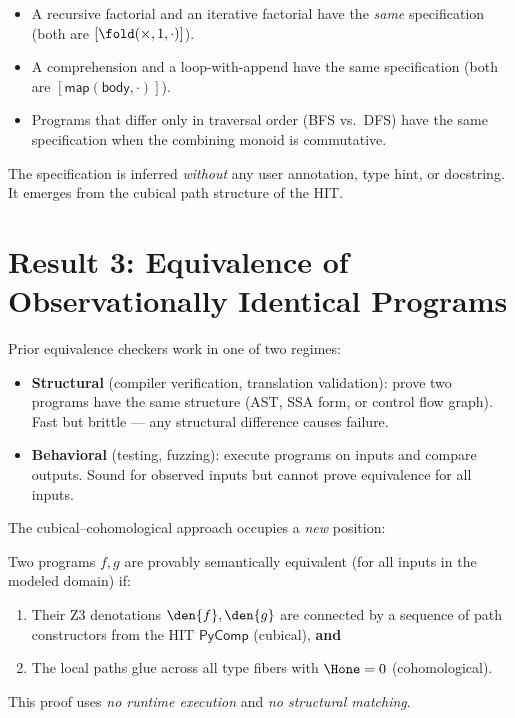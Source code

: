 \begin{itemize}
  \item A recursive factorial and an iterative factorial have the
    \emph{same} specification (both are $[\fold(\times, 1, \cdot)]$).
  \item A comprehension and a loop-with-append have the same
    specification (both are $[\mathsf{map}(\mathsf{body}, \cdot)]$).
  \item Programs that differ only in traversal order (BFS vs.\ DFS)
    have the same specification when the combining monoid is
    commutative.
\end{itemize}

The specification is inferred \emph{without} any user annotation,
type hint, or docstring.  It emerges from the cubical path structure
of the HIT.

\section{Result 3: Equivalence of Observationally Identical Programs}

Prior equivalence checkers work in one of two regimes:
\begin{itemize}
  \item \textbf{Structural} (compiler verification, translation
    validation): prove two programs have the same structure
    (AST, SSA form, or control flow graph).  Fast but brittle ---
    any structural difference causes failure.
  \item \textbf{Behavioral} (testing, fuzzing): execute programs on
    inputs and compare outputs.  Sound for observed inputs but
    cannot prove equivalence for all inputs.
\end{itemize}

The cubical--cohomological approach occupies a \emph{new} position:

\begin{theorem}
\label{thm:semantic}
Two programs $f, g$ are provably semantically equivalent (for all
inputs in the modeled domain) if:
\begin{enumerate}
  \item Their Z3 denotations $\den{f}, \den{g}$ are connected by
    a sequence of path constructors from the HIT $\mathsf{PyComp}$
    (cubical), \textbf{and}
  \item The local paths glue across all type fibers with $\Hone = 0$
    (cohomological).
\end{enumerate}
This proof uses \emph{no runtime execution} and \emph{no structural
matching}.
\end{theorem}

